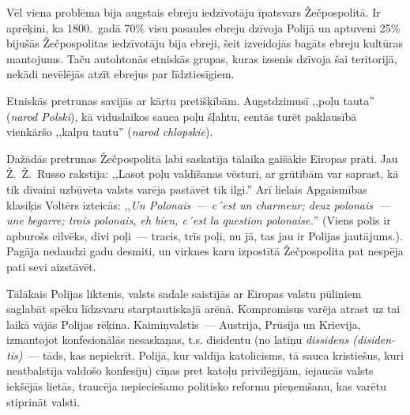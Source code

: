 \documentclass[twoside,a5paper,12pt,fleqn,openany]{extbook}
\newcommand{\pltxti}[1]{\textit{\textpolish{#1}}}
\newcommand{\frtxti}[1]{\textit{\textfrench{#1}}}
\newcommand{\latxti}[1]{\textit{\textlatin{#1}}}
\begin{document}
Vēl viena problēma bija augstais ebreju iedzīvotāju īpatsvars Žečpospolitā. Ir aprēķini, ka 1800.~gadā 70\% visu pasaules ebreju dzīvoja Polijā un aptuveni 25\% bijušās Žečpospolitas iedzīvotāju bija ebreji, šeit izveidojās bagāts ebreju kultūras mantojums. Taču autohtonās etniskās grupas, kuras izsenis dzīvoja šai teritorijā, nekādi nevēlējās atzīt ebrejus par līdztiesīgiem.

Etniskās pretrunas savijās ar kārtu pretišķībām. Augstdzimusī ,,poļu tauta'' (\pltxti{narod Polski}), kā viduslaikos sauca poļu šļahtu, centās turēt paklausībā vienkāršo ,,kalpu tautu'' (\pltxti{narod chlopskie}).

Dažādās pretrunas Žečpospolitā labi saskatīja tālaika gaišākie Eiropas prāti. Jau Ž.~Ž.~Russo rakstīja: ,,Lasot poļu valdīšanas vēsturi, ar grūtībām var saprast, kā tik dīvaini uzbūvēta valsts varēja pastāvēt tik ilgi.'' Arī lielais Apgaismības klasiķis Voltērs izteicās: ,,\frtxti{Un Polonais~--- c´est un charmeur; deuz polonais~--- une begarre; trois polonais, eh bien, c´est la question polonaise.}'' (Viens polis ir apburošs cilvēks, divi poļi~--- tracis, trīs poļi, nu jā, tas jau ir Polijas jautājums.). Pagāja nedaudzi gadu desmiti, un virknes karu izpostītā Žečpospolita pat nespēja pati sevi aizstāvēt.

Tālākais Polijas liktenis, valsts sadale saistījās ar Eiropas valstu pūliņiem saglabāt spēku līdzsvaru starptautiskajā arēnā. Kompromisus varēja atrast uz tai laikā vājās Polijas rēķina. Kaimiņvalstis~--- Austrija, Prūsija un Krievija, izmantojot konfesionālās nesaskaņas, t.s. disidentu (no latīņu \latxti{dissidens (disidentis)}~--- tāds, kas nepiekrīt. Polijā, kur valdīja katolicisms, tā sauca kristiešus, kuri neatbalstīja valdošo konfesiju) cīņas pret katoļu privilēģijām, iejaucās valsts iekšējās lietās, traucēja nepieciešamo politisko reformu pieņemšanu, kas varētu stiprināt valsti.
\end{document}
